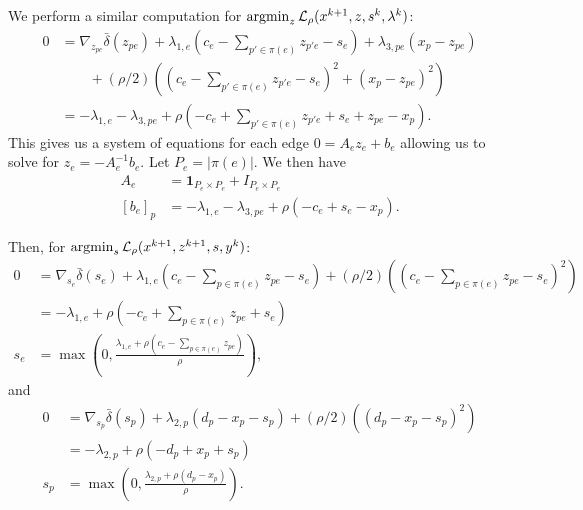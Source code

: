 \documentclass[11pt]{article}
\begin{document}
We perform a similar computation for $\operatorname*{argmin}_{z} \mathcal{L}_\rho(x^{k+1},z,s^k,\lambda^k)$:
\begin{align*}
0
&= \nabla_{z_{pe}}\bar\delta(z_{pe}) + \lambda_{1,e}(c_e - \sum_{p'\in\pi(e)} z_{p'e} - s_{e})
    + \lambda_{3,pe}(x_p - z_{pe})\\
& \qquad + (\rho/2)((c_e - \sum_{p'\in\pi(e)} z_{p'e} - s_e)^2 + (x_p - z_{pe})^2)\\
&= -\lambda_{1,e} - \lambda_{3,pe}
    + \rho(-c_e + \sum_{p'\in\pi(e)} z_{p'e} + s_e  + z_{pe} - x_p).
\end{align*}
This gives us a system of equations for each edge $0 = A_ez_e + b_e$
allowing us to solve for $z_e = -A_e^{-1}b_e$.
Let $P_e= |\pi(e)|$. We then have
\begin{align*}
A_e &= \mathbf{1}_{P_e\times P_e} + I_{P_e\times P_e}\\
[b_e]_p &= -\lambda_{1,e} - \lambda_{3,pe}
    + \rho(-c_e + s_e - x_p).
\end{align*}

Then, for $\operatorname*{argmin}_{s} \mathcal{L}_\rho(x^{k+1},z^{k+1},s,y^k)$:
\begin{align*}
0
&= \nabla_{s_{e}}\bar\delta(s_{e}) + \lambda_{1,e}(c_e - \sum_{p\in\pi(e)} z_{pe} - s_{e})
    + (\rho/2)((c_e - \sum_{p\in\pi(e)} z_{pe} - s_{e})^2)\\
&= -\lambda_{1,e} + \rho(-c_e + \sum_{p\in\pi(e)} z_{pe} + s_e)\\
s_{e} &= \max(0,\frac{\lambda_{1,e} + \rho(c_e - \sum_{p\in\pi(e)}z_{pe})}{\rho}),
\end{align*}
and
\begin{align*}
0
&= \nabla_{s_{p}}\bar\delta(s_{p}) + \lambda_{2,p}(d_p - x_p - s_p)
    + (\rho/2)((d_p - x_p - s_{p})^2)\\
&= -\lambda_{2,p} + \rho(-d_p + x_p + s_p)\\
s_{p} &= \max(0,\frac{\lambda_{2,p} + \rho(d_p - x_p)}{\rho}).
\end{align*}
\end{document}
